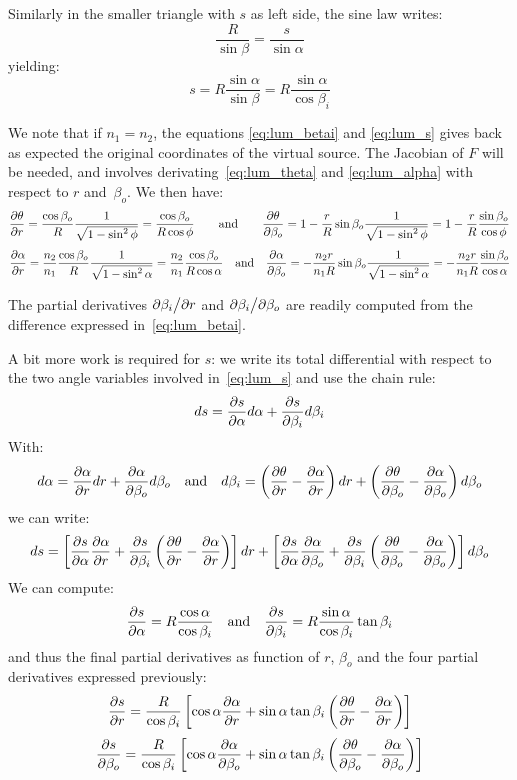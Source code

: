 Similarly in the smaller triangle with $s$ as left side, the sine law writes:
\[  \frac{R}{\sin\beta} = \frac{s}{\sin\alpha} \]
yielding:
\begin{equation}
 s = R\frac{\sin\alpha}{\sin\beta} = R\frac{\sin\alpha}{\cos\beta_i}
 \label{eq:lum_s}
\end{equation}

We note that if $n_1=n_2$, the equations \eqref{eq:lum_betai} and \eqref{eq:lum_s} 
gives back as expected the original coordinates of the virtual source.
 The Jacobian of $F$ will be needed, and involves derivating~\eqref{eq:lum_theta} and
\eqref{eq:lum_alpha} with respect to $r$ and~$\beta_o$.
We then have:
\[
\frac{\partial{\theta}}{\partial{r}}  = \frac{\cos\beta_o}{R} \frac{1}{\sqrt{1-\sin^2\phi}}
      =  \frac{\cos\beta_o}{R \cos\phi}
 \quad  \quad \textrm{and} \quad  \quad 
\frac{\partial{\theta}}{\partial{\beta_o}}  =  1- \frac{r}{R}\sin\beta_o \frac{1}{\sqrt{1-\sin^2\phi}}
        =  1- \frac{r}{R} \frac{\sin\beta_o}{\cos\phi} \\        
\] \[
\frac{\partial{\alpha}}{\partial{r}}  = \frac{n_2}{n_1}\frac{\cos\beta_o}{R}\frac{1}{\sqrt{1-\sin^2\alpha}}
        = \frac{n_2}{n_1}\frac{\cos\beta_o}{R\cos\alpha}
 \quad \textrm{and} \quad
\frac{\partial{\alpha}}{\partial{\beta_o}} = -\frac{n_2 r}{n_1 R}\sin\beta_o\frac{1}{\sqrt{1-\sin^2\alpha}}
        =  -\frac{n_2 r}{n_1 R}\frac{\sin\beta_o}{\cos\alpha}
\]

The partial derivatives ${\partial{\beta_i}}\big/{\partial{r}}$ and ${\partial{\beta_i}}\big/{\partial{\beta_o}}$ are
readily computed from the difference expressed in~\eqref{eq:lum_betai}.

A bit more work is required for $s$: we write its total differential with respect to the 
two angle variables involved in~\eqref{eq:lum_s} and use the chain rule:
\[ ds = \frac{\partial{s}}{\partial{\alpha}}d\alpha + \frac{\partial{s}}{\partial{\beta_i}}d\beta_i \]
With:
\[
d\alpha = \frac{\partial{\alpha}}{\partial{r}}dr + \frac{\partial{\alpha}}{\partial{\beta_o}}d\beta_o
\quad\textrm{and}\quad
 d\beta_i = \left(\frac{\partial{\theta}}{\partial{r}} - \frac{\partial{\alpha}}{\partial{r}}\right) dr + 
        \left(\frac{\partial{\theta}}{\partial{\beta_o}} - \frac{\partial{\alpha}}{\partial{\beta_o}}\right) d\beta_o
 \]
we can write:
\[ds =  \left[ \frac{\partial{s}}{\partial{\alpha}}\frac{\partial{\alpha}}{\partial{r}} 
             + \frac{\partial{s}}{\partial{\beta_i}}\left( \frac{\partial{\theta}}{\partial{r}} - \frac{\partial{\alpha}}{\partial{r}} \right)
        \right] dr 
+       \left[ \frac{\partial{s}}{\partial{\alpha}}\frac{\partial{\alpha}}{\partial{\beta_o}} 
             + \frac{\partial{s}}{\partial{\beta_i}}\left( \frac{\partial{\theta}}{\partial{\beta_o}} - \frac{\partial{\alpha}}{\partial{\beta_o}} \right)
        \right] d\beta_o\]
We can compute:
\[ \frac{\partial{s}}{\partial{\alpha}} = R\frac{\cos\alpha}{\cos\beta_i} 
   \quad\textrm{and}\quad  
   \frac{\partial{s}}{\partial{\beta_i}} = R\frac{\sin\alpha}{\cos\beta_i}\tan\beta_i
   \] 
and thus the final partial derivatives as function of $r$, $\beta_o$ and the four
partial derivatives expressed previously:
\[\frac{\partial{s}}{\partial{r}}  = \frac{R}{\cos\beta_i}  \left[
      \cos\alpha\frac{\partial{\alpha}}{\partial{r}} + \sin\alpha\tan\beta_i
             \left( \frac{\partial{\theta}}{\partial{r}} - \frac{\partial{\alpha}}{\partial{r}} \right) 
    \right]
\]
\[
\frac{\partial{s}}{\partial{\beta_o}}  = \frac{R}{\cos\beta_i}  \left[
      \cos\alpha\frac{\partial{\alpha}}{\partial{\beta_o}} + \sin\alpha\tan\beta_i
            \left( \frac{\partial{\theta}}{\partial{\beta_o}} - \frac{\partial{\alpha}}{\partial{\beta_o}} \right)
     \right]
\]

